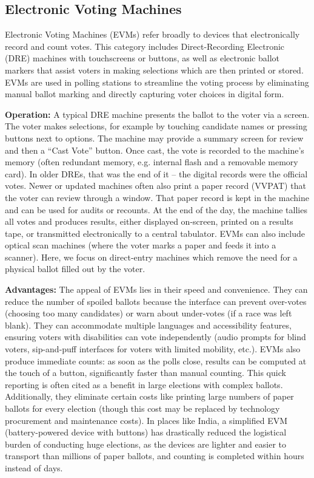 \documentclass[a4paper,10pt]{report}
\begin{document}
\subsection{Electronic Voting Machines}

Electronic Voting Machines (EVMs) refer broadly to devices that electronically record and count votes. This category includes Direct-Recording Electronic (DRE) machines with touchscreens or buttons, as well as electronic ballot markers that assist voters in making selections which are then printed or stored. EVMs are used in polling stations to streamline the voting process by eliminating manual ballot marking and directly capturing voter choices in digital form.

\textbf {Operation:} A typical DRE machine presents the ballot to the voter via a screen. The voter makes selections, for example by touching candidate names or pressing buttons next to options. The machine may provide a summary screen for review and then a “Cast Vote” button. Once cast, the vote is recorded to the machine’s memory (often redundant memory, e.g. internal flash and a removable memory card). In older DREs, that was the end of it – the digital records were the official votes. Newer or updated machines often also print a paper record (VVPAT) that the voter can review through a window. That paper record is kept in the machine and can be used for audits or recounts. At the end of the day, the machine tallies all votes and produces results, either displayed on-screen, printed on a results tape, or transmitted electronically to a central tabulator. EVMs can also include optical scan machines (where the voter marks a paper and feeds it into a scanner). Here, we focus on direct-entry machines which remove the need for a physical ballot filled out by the voter.

\textbf {Advantages:} The appeal of EVMs lies in their speed and convenience. They can reduce the number of spoiled ballots because the interface can prevent over-votes (choosing too many candidates) or warn about under-votes (if a race was left blank). They can accommodate multiple languages and accessibility features, ensuring voters with disabilities can vote independently (audio prompts for blind voters, sip-and-puff interfaces for voters with limited mobility, etc.). EVMs also produce immediate counts: as soon as the polls close, results can be computed at the touch of a button, significantly faster than manual counting. This quick reporting is often cited as a benefit in large elections with complex ballots. Additionally, they eliminate certain costs like printing large numbers of paper ballots for every election (though this cost may be replaced by technology procurement and maintenance costs). In places like India, a simplified EVM (battery-powered device with buttons) has drastically reduced the logistical burden of conducting huge elections, as the devices are lighter and easier to transport than millions of paper ballots, and counting is completed within hours instead of days.
\end{document}
